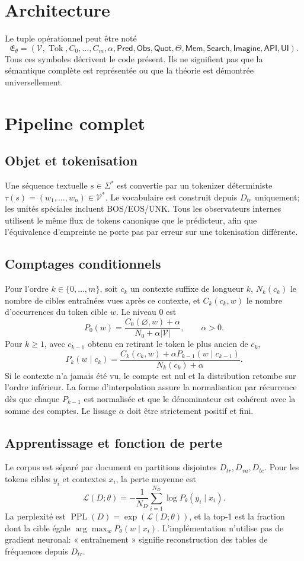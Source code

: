 \documentclass[11pt,a4paper]{article}
\begin{document}
\section{Architecture}
Le tuple opérationnel peut être noté
\[
\mathfrak E_\theta=(\mathcal V,\operatorname{Tok},C_0,\ldots,C_m,\alpha,\mathsf{Pred},\mathsf{Obs},\mathsf{Quot},\Theta,\mathsf{Mem},\mathsf{Search},\mathsf{Imagine},\mathsf{API},\mathsf{UI}).
\]
Tous ces symboles décrivent le code présent. Ils ne signifient pas que la sémantique complète est représentée ou que la théorie est démontrée universellement.
\section{Pipeline complet}
\subsection{Objet et tokenisation}
Une séquence textuelle $s\in\Sigma^*$ est convertie par un tokenizer déterministe $\tau(s)=(w_1,\ldots,w_n)\in\mathcal V^*$. Le vocabulaire est construit depuis $D_{tr}$ uniquement; les unités spéciales incluent BOS/EOS/UNK. Tous les observateurs internes utilisent le même flux de tokens canonique que le prédicteur, afin que l'équivalence d'empreinte ne porte pas par erreur sur une tokenisation différente.
\subsection{Comptages conditionnels}
Pour l'ordre $k\in\{0,\ldots,m\}$, soit $c_k$ un contexte suffixe de longueur $k$, $N_k(c_k)$ le nombre de cibles entraînées vues après ce contexte, et $C_k(c_k,w)$ le nombre d'occurrences du token cible $w$. Le niveau 0 est
\[
P_0(w)=\frac{C_0(\varnothing,w)+\alpha}{N_0+\alpha|\mathcal V|},\qquad \alpha>0.
\]
Pour $k\geq1$, avec $c_{k-1}$ obtenu en retirant le token le plus ancien de $c_k$,
\[
P_k(w\mid c_k)=\frac{C_k(c_k,w)+\alpha P_{k-1}(w\mid c_{k-1})}{N_k(c_k)+\alpha}.
\]
Si le contexte n'a jamais été vu, le compte est nul et la distribution retombe sur l'ordre inférieur. La forme d'interpolation assure la normalisation par récurrence dès que chaque $P_{k-1}$ est normalisée et que le dénominateur est cohérent avec la somme des comptes. Le lissage $\alpha$ doit être strictement positif et fini.
\subsection{Apprentissage et fonction de perte}
Le corpus est séparé par document en partitions disjointes $D_{tr},D_{va},D_{te}$. Pour les tokens cibles $y_i$ et contextes $x_i$, la perte moyenne est
\[
\mathcal L(D;\theta)=-\frac{1}{N_D}\sum_{i=1}^{N_D}\log P_\theta(y_i\mid x_i).
\]
La perplexité est $\operatorname{PPL}(D)=\exp(\mathcal L(D;\theta))$, et la top-1 est la fraction dont la cible égale $\arg\max_w P_\theta(w\mid x_i)$. L'implémentation n'utilise pas de gradient neuronal: « entraînement » signifie reconstruction des tables de fréquences depuis $D_{tr}$.
\end{document}
